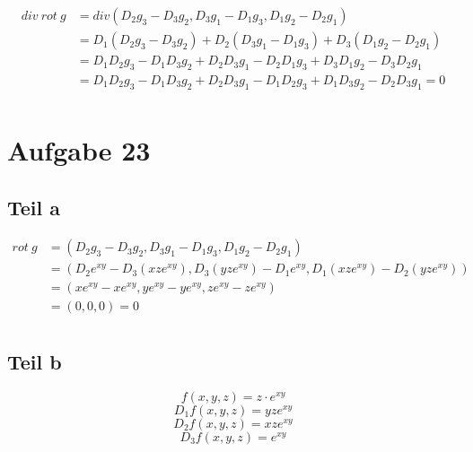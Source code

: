 \documentclass[10pt,a4paper]{article}
\begin{document}
\begin{align*}
div\ rot\ g & = div (D_{2}g_{3} - D_{3}g_{2}, D_{3}g_{1} - D_{1}g_{3}, D_{1}g_{2} - D_{2}g_{1})\\
& = D_{1}(D_{2}g_{3} - D_{3}g_{2}) + D_{2}(D_{3}g_{1} - D_{1}g_{3}) + D_{3}(D_{1}g_{2} - D_{2}g_{1})\\
& = D_{1}D_{2}g_{3} - D_{1}D_{3}g_{2} + D_{2}D_{3}g_{1} - D_{2}D_{1}g_{3} + D_{3}D_{1}g_{2} - D_{3}D_{2}g_{1}\\
& = D_{1}D_{2}g_{3} - D_{1}D_{3}g_{2} + D_{2}D_{3}g_{1} - D_{1}D_{2}g_{3} + D_{1}D_{3}g_{2} - D_{2}D_{3}g_{1} = 0\\
\end{align*}

\section*{Aufgabe 23}

\subsection*{Teil a}

\begin{align*}
rot\ g & = (D_{2}g_{3} - D_{3}g_{2}, D_{3}g_{1} - D_{1}g_{3}, D_{1}g_{2} - D_{2}g_{1})\\
& = (D_{2}e^{xy} - D_{3}(xze^{xy}), D_{3}(yze^{xy}) - D_{1}e^{xy}, D_{1}(xze^{xy}) - D_{2}(yze^{xy}))\\
& = (xe^{xy} - xe^{xy}, ye^{xy} - ye^{xy}, ze^{xy} - ze^{xy})\\
& = (0, 0, 0) = 0\\
\end{align*}

\subsection*{Teil b}

\begin{equation}
f(x, y, z) = z \cdot e^{xy}
\end{equation}
\begin{equation}
D_{1}f(x, y, z) = yze^{xy}
\end{equation}
\begin{equation}
D_{2}f(x, y, z) = xze^{xy}
\end{equation}
\begin{equation}
D_{3}f(x, y, z) = e^{xy}
\end{equation}
\end{document}
